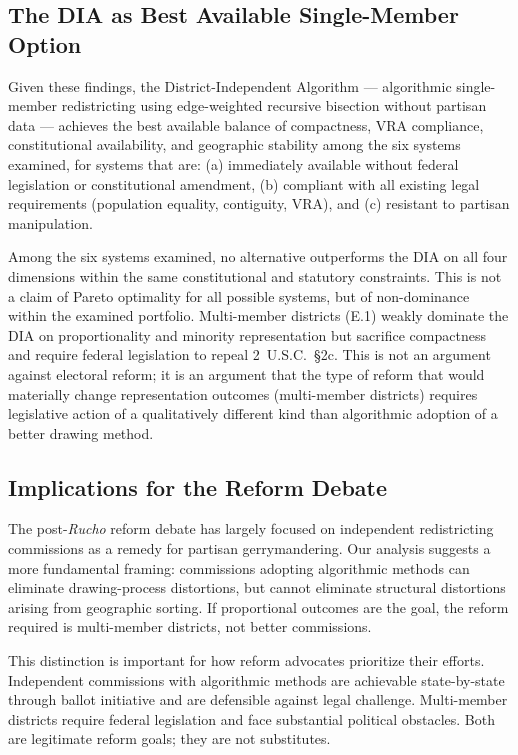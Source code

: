 \subsection{The DIA as Best Available Single-Member Option}

Given these findings, the District-Independent Algorithm --- algorithmic
single-member redistricting using edge-weighted recursive bisection without
partisan data --- achieves the best available balance of compactness, VRA
compliance, constitutional availability, and geographic stability among the
six systems examined, for systems that are:
(a) immediately available without federal legislation or constitutional amendment,
(b) compliant with all existing legal requirements (population equality,
contiguity, VRA), and
(c) resistant to partisan manipulation.

Among the six systems examined, no alternative outperforms the DIA on all four
dimensions within the same constitutional and statutory constraints.  This is
not a claim of Pareto optimality for all possible systems, but of
non-dominance within the examined portfolio.  Multi-member districts (E.1)
weakly dominate the DIA on proportionality and minority representation but
sacrifice compactness and require federal legislation to repeal 2~U.S.C.~\S2c.
This is not an argument against electoral reform; it is an argument that the
type of reform that would materially change representation outcomes
(multi-member districts) requires legislative action of a qualitatively
different kind than algorithmic adoption of a better drawing method.

\subsection{Implications for the Reform Debate}

The post-\emph{Rucho} reform debate has largely focused on independent
redistricting commissions as a remedy for partisan gerrymandering.  Our
analysis suggests a more fundamental framing: commissions adopting algorithmic
methods can eliminate drawing-process distortions, but cannot eliminate
structural distortions arising from geographic sorting.  If proportional
outcomes are the goal, the reform required is multi-member districts, not
better commissions.

This distinction is important for how reform advocates prioritize their
efforts.  Independent commissions with algorithmic methods are achievable
state-by-state through ballot initiative and are defensible against legal
challenge.  Multi-member districts require federal legislation and face
substantial political obstacles.  Both are legitimate reform goals; they are
not substitutes.

